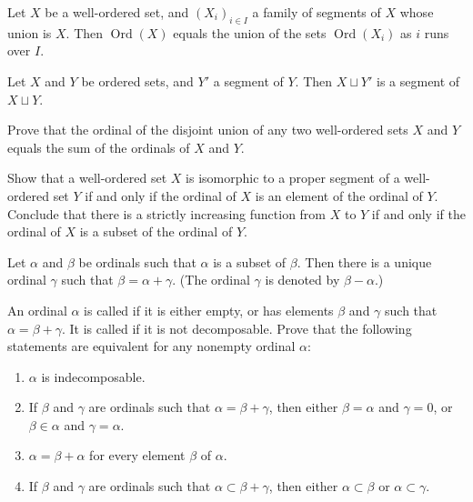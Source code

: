 \documentclass{article}
\begin{document}
\begin{exercise}
  \label{exe:e0x1yv2c}
  Let \(X\) be a well-ordered set, and \((X_i)_{i \in I}\) a family of
  segments of \(X\) whose union is \(X\).  Then
  \(\operatorname{Ord}(X)\) equals the union of the sets
  \(\operatorname{Ord}(X_i)\) as \(i\) runs over \(I\).
\end{exercise}

\begin{exercise}
  \label{exe:5b354opw}
  Let \(X\) and \(Y\) be ordered sets, and \(Y'\) a segment of \(Y\).
  Then \(X \sqcup Y'\) is a segment of \(X \sqcup Y\).
\end{exercise}

\begin{exercise}
  \label{exe:747n2vsf}
  Prove that the ordinal of the disjoint union of any two well-ordered
  sets \(X\) and \(Y\) equals the sum of the ordinals of \(X\) and
  \(Y\).
\end{exercise}

\begin{exercise}
  \label{exe:azb90ixm}
  Show that a well-ordered set \(X\) is isomorphic to a proper segment
  of a well-ordered set \(Y\) if and only if the ordinal of \(X\) is
  an element of the ordinal of \(Y\).  Conclude that there is a
  strictly increasing function from \(X\) to \(Y\) if and only if the
  ordinal of \(X\) is a subset of the ordinal of \(Y\).
\end{exercise}

\begin{exercise}
  \label{exe:ag2uw6ck}
  Let \(\alpha\) and \(\beta\) be ordinals such that \(\alpha\) is a
  subset of \(\beta\).  Then there is a unique ordinal \(\gamma\) such
  that \(\beta = \alpha + \gamma\).  (The ordinal \(\gamma\) is
  denoted by \(\beta - \alpha\).)
\end{exercise}

\begin{exercise}
  \label{exe:nu1k66wl}
  An ordinal \(\alpha\) is called  if it is
  either empty, or has elements \(\beta\) and \(\gamma\) such that
  \(\alpha = \beta + \gamma\).  It is called
   if it is not decomposable.  Prove that
  the following statements are equivalent for any nonempty ordinal
  \(\alpha\):
  \begin{enumerate}
  \item \(\alpha\) is indecomposable.
  \item If \(\beta\) and \(\gamma\) are ordinals such that
    \(\alpha = \beta + \gamma\), then either \(\beta = \alpha\) and
    \(\gamma = 0\), or \(\beta \in \alpha\) and \(\gamma = \alpha\).
  \item \(\alpha = \beta + \alpha\) for every element \(\beta\) of
    \(\alpha\).
  \item If \(\beta\) and \(\gamma\) are ordinals such that
    \(\alpha \subset \beta + \gamma\), then either
    \(\alpha \subset \beta\) or \(\alpha \subset \gamma\).
  \end{enumerate}
\end{exercise}
\end{document}
